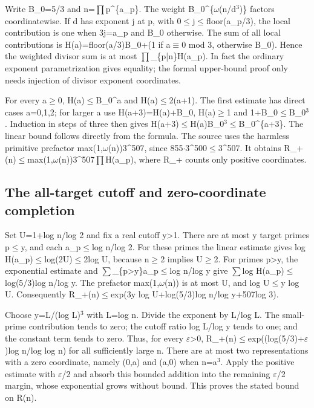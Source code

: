 \documentclass[11pt,a4paper]{article}
\begin{document}
Write B\_0=5/3 and n=\ensuremath{\prod}p\textasciicircum{}\{a\_p\}. The weight B\_0\textasciicircum{}\{\ensuremath{\omega}(n/d\ensuremath{^3})\} factors coordinatewise. If d has exponent j at p, with 0\ensuremath{\leq}j\ensuremath{\leq}floor(a\_p/3), the local contribution is one when 3j=a\_p and B\_0 otherwise. The sum of all local contributions is H(a)=floor(a/3)B\_0+(1 if a\ensuremath{\equiv}0 mod 3, otherwise B\_0). Hence the weighted divisor sum is at most \ensuremath{\prod}\_\{p|n\}H(a\_p). In fact the ordinary exponent parametrization gives equality; the formal upper-bound proof only needs injection of divisor exponent coordinates.

For every a\ensuremath{\geq}0, H(a)\ensuremath{\leq}B\_0\textasciicircum{}a and H(a)\ensuremath{\leq}2(a+1). The first estimate has direct cases a=0,1,2; for larger a use H(a+3)=H(a)+B\_0, H(a)\ensuremath{\geq}1 and 1+B\_0\ensuremath{\leq}B\_0\ensuremath{^3}. Induction in steps of three then gives H(a+3)\ensuremath{\leq}H(a)B\_0\ensuremath{^3}\ensuremath{\leq}B\_0\textasciicircum{}\{a+3\}. The linear bound follows directly from the formula. The source uses the harmless primitive prefactor max(1,\ensuremath{\omega}(n))3\textasciicircum{}507, since 855\ensuremath{\cdot}3\textasciicircum{}500\ensuremath{\leq}3\textasciicircum{}507. It obtains R\_+(n)\ensuremath{\leq}max(1,\ensuremath{\omega}(n))3\textasciicircum{}507\ensuremath{\prod}H(a\_p), where R\_+ counts only positive coordinates.

\subsection{The all-target cutoff and zero-coordinate completion}
Set U=1+log n/log 2 and fix a real cutoff y>1. There are at most y target primes p\ensuremath{\leq}y, and each a\_p\ensuremath{\leq}log n/log 2. For these primes the linear estimate gives log H(a\_p)\ensuremath{\leq}log(2U)\ensuremath{\leq}2log U, because n\ensuremath{\geq}2 implies U\ensuremath{\geq}2. For primes p>y, the exponential estimate and \ensuremath{\sum}\_\{p>y\}a\_p\ensuremath{\leq}log n/log y give \ensuremath{\sum}log H(a\_p)\ensuremath{\leq}log(5/3)log n/log y. The prefactor max(1,\ensuremath{\omega}(n)) is at most U, and log U\ensuremath{\leq}y log U. Consequently R\_+(n)\ensuremath{\leq}exp(3y log U+log(5/3)log n/log y+507log 3).

Choose y=L/(log L)\ensuremath{^3} with L=log n. Divide the exponent by L/log L. The small-prime contribution tends to zero; the cutoff ratio log L/log y tends to one; and the constant term tends to zero. Thus, for every \ensuremath{\varepsilon}>0, R\_+(n)\ensuremath{\leq}exp((log(5/3)+\ensuremath{\varepsilon})log n/log log n) for all sufficiently large n. There are at most two representations with a zero coordinate, namely (0,a) and (a,0) when n=a\ensuremath{^3}. Apply the positive estimate with \ensuremath{\varepsilon}/2 and absorb this bounded addition into the remaining \ensuremath{\varepsilon}/2 margin, whose exponential grows without bound. This proves the stated bound on R(n).
\end{document}
